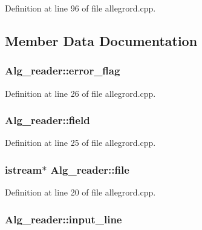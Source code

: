 Definition at line 96 of file allegrord.\+cpp.



\subsection{Member Data Documentation}
\subsubsection[{\texorpdfstring{error\+\_\+flag}{error_flag}}]{ Alg\+\_\+reader\+::error\+\_\+flag}\hypertarget{class_alg__reader_a7a8615f50e9603b4727ab2d0e2521fb2}{}\label{class_alg__reader_a7a8615f50e9603b4727ab2d0e2521fb2}


Definition at line 26 of file allegrord.\+cpp.

\subsubsection[{\texorpdfstring{field}{field}}]{ Alg\+\_\+reader\+::field}\hypertarget{class_alg__reader_a8dbbb4d9e645c813f48da19a13a97947}{}\label{class_alg__reader_a8dbbb4d9e645c813f48da19a13a97947}


Definition at line 25 of file allegrord.\+cpp.

\subsubsection[{\texorpdfstring{file}{file}}]{\setlength{\rightskip}{0pt plus 5cm}istream$\ast$ Alg\+\_\+reader\+::file}\hypertarget{class_alg__reader_a1d582d49e3722788198e87a825e59b85}{}\label{class_alg__reader_a1d582d49e3722788198e87a825e59b85}


Definition at line 20 of file allegrord.\+cpp.

\subsubsection[{\texorpdfstring{input\+\_\+line}{input_line}}]{ Alg\+\_\+reader\+::input\+\_\+line}\hypertarget{class_alg__reader_a4223f6a0df4bf4aa24de878607dcc89c}{}\label{class_alg__reader_a4223f6a0df4bf4aa24de878607dcc89c}


